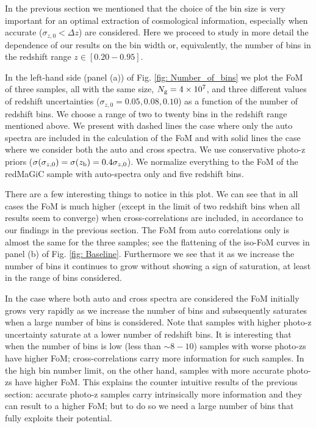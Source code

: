 \documentclass[a4paper,fleqn,usenatbib]{mnras}
\begin{document}
In the previous section we mentioned that the choice of the bin size is very important for an optimal extraction of cosmological information, especially when accurate ($\sigma_{z,0} < \Delta z$)  are considered. Here we proceed to study in more detail the dependence of our results on the bin width or, equivalently, the number of bins in the redshift range $z \in [0.20-0.95]$. 

In the left-hand side (panel (a)) of Fig. \ref{fig: Number_of_bins} we plot the FoM of three samples, all with the same size, $N_{\mbox{\scriptsize{g}}} = 4 \times 10^7$, and three different values of redshift uncertainties ($\sigma_{z,0} = 0.05, 0.08, 0.10$) as a function of the number of redshift bins. We choose a range of two to twenty bins in the redshift range mentioned above. We present with dashed lines the case where only the auto spectra are included in the calculation of the FoM and with solid lines the case where we consider both the auto and cross spectra. We use conservative photo-z priors ($\sigma(\sigma_{z,0}) = \sigma(z_{\mbox{\scriptsize{b}}}) = 0.4  \sigma_{z,0}$). We normalize everything to the FoM of the redMaGiC sample with auto-spectra only and five redshift bins.

There are a few interesting things to notice in this plot. We can see that in all cases the FoM is much higher (except in the limit of two redshift bins when all results seem to converge) when cross-correlations are included, in accordance to our findings in the previous section. The FoM from auto correlations only is almost the same for the three samples; see the flattening of the iso-FoM curves in panel (b) of Fig. \ref{fig: Baseline}. Furthermore we see that it as we increase the number of bins it continues to grow without showing a sign of saturation, at least in the range of bins considered. 

In the case where both auto and cross spectra are considered the FoM initially grows very rapidly as we increase the number of bins and subsequently saturates when a large number of bins is considered. Note that samples with higher photo-z uncertainty saturate at a lower number of redshift bins. It is interesting that when the number of bins is low (less than $\sim 8-10$) samples with worse photo-zs have higher FoM; cross-correlations carry more information for such samples. In the high bin number limit, on the other hand, samples with more accurate photo-zs have higher FoM. This explains the counter intuitive results of the previous section: accurate photo-z samples carry intrinsically more information and they can result to a higher FoM; but to do so we need a large number of bins that fully exploits their potential.
\end{document}
